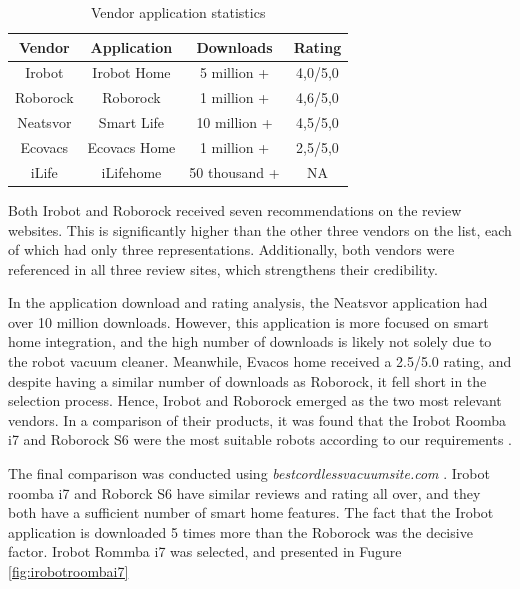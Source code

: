 \begin{table}[H]
\centering
\caption{Vendor application statistics}
\label{tab:VendorApplicationStat}
\begin{tabular}{|c|c|c|c|}
\hline
\textbf{Vendor} & \textbf{Application} & \textbf{Downloads} & \textbf{Rating} \\ \hline
Irobot          & Irobot Home          & 5 million +        & 4,0/5,0         \\ \hline
Roborock        & Roborock             & 1 million +        & 4,6/5,0         \\ \hline
Neatsvor        & Smart Life           & 10 million +       & 4,5/5,0         \\ \hline
Ecovacs         & Ecovacs Home         & 1 million +        & 2,5/5,0         \\ \hline
iLife           & iLifehome            & 50 thousand +      & NA              \\ \hline
\end{tabular}
\end{table}
Both Irobot and Roborock received seven recommendations on the review websites. This is significantly higher than the other three vendors on the list, each of which had only three representations. Additionally, both vendors were referenced in all three review sites, which strengthens their credibility. 

In the application download and rating analysis, the Neatsvor application had over 10 million downloads. However, this application is more focused on smart home integration, and the high number of downloads is likely not solely due to the robot vacuum cleaner. Meanwhile, Evacos home received a 2.5/5.0 rating, and despite having a similar number of downloads as Roborock, it fell short in the selection process. Hence, Irobot and Roborock emerged as the two most relevant vendors. In a comparison of their products, it was found that the Irobot Roomba i7 and Roborock S6 were the most suitable robots according to our requirements \cite{robotsel8} \cite{robotsel6}. 

The final comparison was conducted using \textit{bestcordlessvacuumsite.com} \cite{robotsel9}. Irobot roomba i7 and Roborck S6 have similar reviews and rating all over, and they both have a sufficient number of smart home features. The fact that the Irobot application is downloaded 5 times more than the Roborock was the decisive factor. Irobot Rommba i7 was selected, and presented in Fugure \ref{fig:irobotroombai7} 


